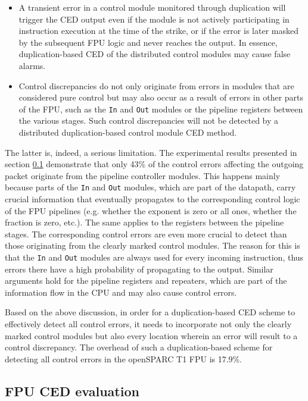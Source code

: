 \documentclass[12pt]{yalephd}
\begin{document}
\begin{itemize}
\item A transient error in a control module monitored through duplication will trigger the CED output even if the module is not actively participating in instruction execution at the time of the strike, or if the error is later masked by the subsequent FPU logic and never reaches the output. In essence, duplication-based CED of the distributed control modules may cause false alarms.
\item Control discrepancies do not only originate from errors in modules that are considered pure control but may also occur as a result of errors in other parts of the FPU, such as the {\tt In} and {\tt Out} modules or the pipeline registers between the various stages. Such control discrepancies will not be detected by a distributed duplication-based control module CED method.
\end{itemize}

The latter is, indeed, a serious limitation. The experimental results presented in section \ref{sC3sFResults} demonstrate that only 43\% of the control errors affecting the outgoing packet originate from the pipeline controller modules. This happens mainly because parts of the {\tt In} and {\tt Out} modules, which are part of the datapath, carry crucial information that eventually propagates to the corresponding control logic of the FPU pipelines (e.g. whether the exponent is zero or all ones, whether the fraction is zero, etc.). The same applies to the registers between the pipeline stages. The corresponding control errors are even more crucial to detect than those originating from the clearly marked control modules. The reason for this is that the {\tt In} and {\tt Out} modules are always used for every incoming instruction, thus errors there have a high probability of propagating to the output. Similar arguments hold for the pipeline registers and repeaters, which are part of the information flow in the CPU and may also cause control errors.

Based on the above discussion, in order for a duplication-based CED scheme to effectively detect all control errors, it needs to incorporate not only the clearly marked control modules but also every location wherein an error will result to a control discrepancy. The overhead of such a duplication-based scheme for detecting all control errors in the openSPARC T1 FPU is 17.9\%.

\subsection{FPU CED evaluation}\label{sC3sFResults}
\end{document}

